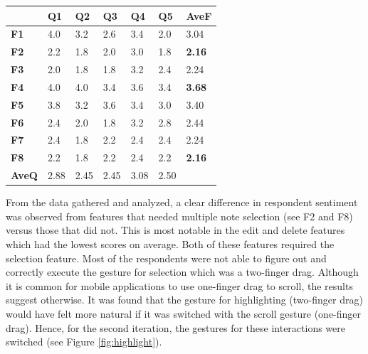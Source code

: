 			\begin{table}[!htpb]
			  \centering
			   \label{tab:results-features-it1}
			  \begin{tabular}{|R{1.5cm}|R{1cm}|R{1cm}|R{1cm}|R{1cm}|R{1cm}|R{1.5cm}|}
			  	\hline
			  	& \textbf{Q1} & \textbf{Q2} & \textbf{Q3} & \textbf{Q4} & \textbf{Q5} & \textbf{AveF} \\ 
			    \hline
			    \textbf{F1} & 4.0 		& 3.2 	& 2.6 	& 3.4 	& 2.0 	& 3.04 \\ \hline
			    \textbf{F2} & 2.2 		& 1.8 	& 2.0 	& 3.0 	& 1.8 	& \textbf{2.16} \\ \hline
			    \textbf{F3} & 2.0 		& 1.8 	& 1.8 	& 3.2 	& 2.4 	& 2.24 \\ \hline
			    \textbf{F4} & 4.0 		& 4.0 	& 3.4 	& 3.6 	& 3.4 	& \textbf{3.68} \\ \hline
			    \textbf{F5} & 3.8 		& 3.2 	& 3.6 	& 3.4 	& 3.0 	& 3.40 \\ \hline
			   	\textbf{F6} & 2.4 		& 2.0 	& 1.8 	& 3.2 	& 2.8 	& 2.44 \\ \hline
			    \textbf{F7} & 2.4 		& 1.8 	& 2.2 	& 2.4 	& 2.4 	& 2.24 \\ \hline
			    \textbf{F8} & 2.2 		& 1.8 	& 2.2 	& 2.4 	& 2.2 	& \textbf{2.16} \\
			    
			    \hline
			    \textbf{AveQ} & 2.88 & 2.45 & 2.45 & 3.08 & 2.50 & \\
			    \hline
			  \end{tabular}
			\end{table}

			From the data gathered and analyzed, a clear difference in respondent sentiment was observed from features that needed multiple note selection (see F2 and F8) versus those that did not. This is most notable in the edit and delete features which had the lowest scores on average. Both of these features required the selection feature. Most of the respondents were not able to figure out and correctly execute the gesture for selection which was a two-finger drag. Although it is common for mobile applications to use one-finger drag to scroll, the results suggest otherwise. It was found that the gesture for highlighting (two-finger drag) would have felt more natural if it was switched with the scroll gesture (one-finger drag). Hence, for the second iteration, the gestures for these interactions were switched (see Figure \ref{fig:highlight}).

